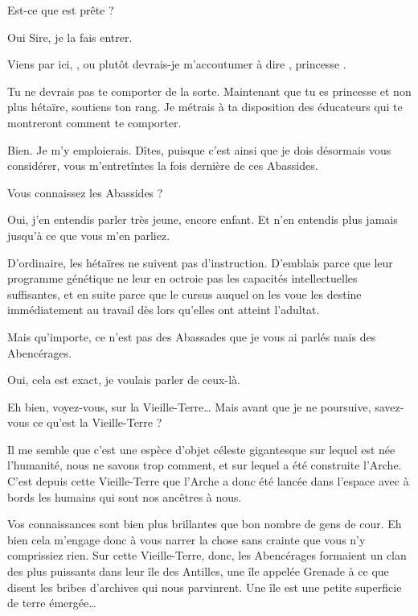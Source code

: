 \begin{drama}

  \elenaspeaks Est-ce que \ela est prête ?

  \alexasspeaks Oui Sire, je la fais entrer.

  \intrat{\ela}
  \exit{\alexas{}}

  \elenaspeaks Viens par ici, \ela, ou plutôt devrais-je m’accoutumer à dire \princesse, princesse \princesse.



  Tu ne devrais pas te comporter de la sorte. Maintenant que tu es princesse et non plus hétaïre, soutiens ton rang. Je métrais à ta disposition des éducateurs qui te montreront comment te comporter.

  \elaspeaks Bien. Je m’y emploierais. Dîtes,  puisque c’est ainsi que je dois désormais vous considérer, vous m’entretîntes la fois dernière de ces Abassides.

  \elenaspeaks {} Vous connaissez les Abassides ?

  \elaspeaks Oui, j’en entendis parler très jeune, encore enfant. Et n’en entendis plus jamais jusqu’à ce que vous m’en parliez.

  \elenaspeaks D’ordinaire, les hétaïres ne suivent pas d’instruction. D’emblais parce que leur programme génétique ne leur en octroie pas les capacités intellectuelles suffisantes, et en suite parce que le cursus auquel on les voue les destine immédiatement au travail dès lors qu’elles ont atteint l’adultat.

  Mais qu’importe, ce n’est pas des Abassades que je vous ai parlés mais des Abencérages.

  \elaspeaks Oui, cela est exact, je voulais parler de ceux-là.


  \elenaspeaks Eh bien, voyez-vous, sur la Vieille-Terre… Mais avant que je ne poursuive, savez-vous ce qu’est la Vieille-Terre ?

  \elaspeaks Il me semble que c’est une espèce d’objet céleste gigantesque sur lequel est née l’humanité, nous ne savons trop comment, et sur lequel a été construite l’Arche. C’est depuis cette Vieille-Terre que l’Arche a donc été lancée dans l’espace avec à bords les humains qui sont nos ancêtres à nous.

  \elenaspeaks Vos connaissances sont bien plus brillantes que bon nombre de gens de cour. Eh bien cela m’engage donc à vous narrer la chose sans crainte que vous n’y comprissiez rien.
  Sur cette Vieille-Terre, donc, les Abencérages formaient un clan des plus puissants dans leur île des Antilles, une île appelée Grenade à ce que disent les bribes d’archives qui nous parvinrent. Une île est une petite superficie de terre émergée…


\end{drama}
